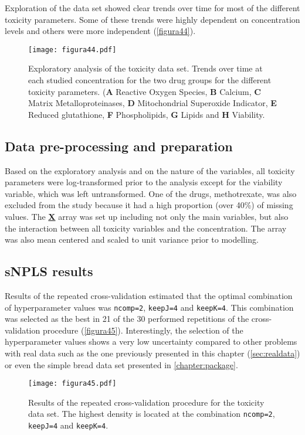 Exploration of the data set showed clear trends over time for most of the different toxicity parameters. Some of these trends were highly dependent on concentration levels and others were more independent (\autoref{figura44}).

\begin{figure}[hbtp]
	\centering
\texttt{[image: figura44.pdf]}
\caption[Exploratory analysis of the toxicity data set]{Exploratory analysis of the toxicity data set. Trends over time at each studied concentration for the two drug groups for the different toxicity parameters. (\textbf{A} Reactive Oxygen Species, \textbf{B} Calcium, \textbf{C} Matrix Metalloproteinases, \textbf{D} Mitochondrial Superoxide Indicator, \textbf{E} Reduced glutathione, \textbf{F} Phospholipids, \textbf{G} Lipids and \textbf{H} Viability.}
\label{figura44}
\end{figure}

\subsection{Data pre-processing and preparation}
Based on the exploratory analysis and on the nature of the variables, all toxicity parameters were log-transformed prior to the analysis except for the viability variable, which was left untransformed. One of the drugs, methotrexate, was also excluded from the study because it had a high proportion (over 40\%) of missing values. The \underline{\textbf{X}} array was set up including not only the main variables, but also the interaction between all toxicity variables and the concentration. The array was also mean centered and scaled to unit variance prior to modelling.

\subsection{sNPLS results}
Results of the repeated cross-validation estimated that the optimal combination of hyperparameter values was \texttt{ncomp=2}, \texttt{keepJ=4} and \texttt{keepK=4}. This combination was selected as the best in 21 of the 30 performed repetitions of the cross-validation procedure (\autoref{figura45}). Interestingly, the selection of the hyperparameter values shows a very low uncertainty compared to other problems with real data such as the one previously presented in this chapter (\autoref{sec:realdata}) or even the simple bread data set presented in \autoref{chapter:package}.

\begin{figure}[hbtp]
	\centering
\texttt{[image: figura45.pdf]}
\caption[Results of the repeated cross-validation procedure for the toxicity data set]{Results of the repeated cross-validation procedure for the toxicity data set. The highest density is located at the combination \texttt{ncomp=2}, \texttt{keepJ=4} and \texttt{keepK=4}.}
\label{figura45}
\end{figure}

